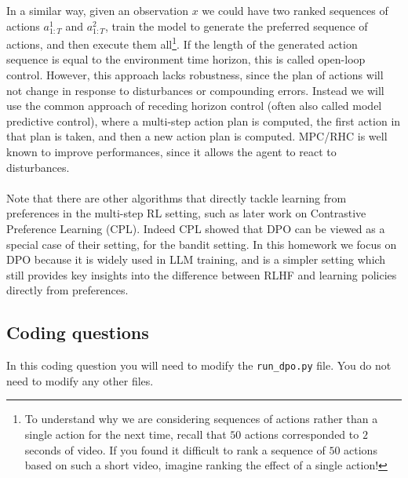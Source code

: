 \documentclass{article}
\begin{document}
In a similar way, given an observation $x$ we could have two ranked sequences of actions $a^1_{1:T}$ and $a^2_{1:T}$, train the model to generate the preferred sequence of actions, and then execute them all\footnote{To understand why we are considering sequences of actions rather than a single action for the next time, recall that $50$ actions corresponded to $2$ seconds of video. If you found it difficult to rank a sequence of $50$ actions based on such a short video, imagine ranking the effect of a single action!}. If the length of the generated action sequence is equal to the environment time horizon, this is called open-loop control. However, this approach lacks robustness, since the plan of actions will not change in response to disturbances or compounding errors. Instead we will use the common approach of receding horizon control (often also called model predictive control), where a multi-step action plan is computed, the first action in that plan is taken, and then a new action plan is computed. MPC/RHC is well known to improve performances, since it allows the agent to react to disturbances. 
\\
\\
Note that there are other algorithms that directly tackle learning from preferences in the multi-step RL setting, such as later work on Contrastive Preference Learning (CPL). Indeed CPL showed that DPO can be viewed as a special case of their setting, for the bandit setting. In this homework we focus on DPO because it is widely used in LLM training, and is a simpler setting which still provides key insights into the difference between RLHF and learning policies directly from preferences. 

\subsection{Coding questions}

In this coding question you will need to modify the \texttt{run\_dpo.py} file. You do not need to modify any other files.
\end{document}
